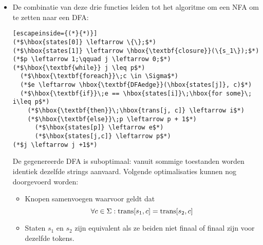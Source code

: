 \begin{itemize}
\begin{enumerate}
		Via deze functie, de startstaat $s_1$ en input string $c_1, ..., c_k$ kan de NFA simulatie als volgt geschreven worden:
			\begin{lstlisting}[escapeinside={(*}{*)}]
(*$d \leftarrow \hbox{\textbf{closure}}(\{s_1\})$*)
(*$\hbox{\textbf{for}} i \leftarrow 1\;\hbox{\textbf{to}}\;k$*)
  (*$d \leftarrow \hbox{\textbf{DFAedge}}(d, c_i)$*)
			\end{lstlisting}
	
		
	\end{enumerate}
	\item De combinatie van deze drie functies leiden tot het algoritme om een NFA om te zetten naar een DFA:
	\begin{lstlisting}[escapeinside={(*}{*)}]
(*$\hbox{states[0]} \leftarrow \{\};$*)
(*$\hbox{states[1]} \leftarrow \hbox{\textbf{closure}}(\{s_1\});$*)
(*$p \leftarrow 1;\qquad j \leftarrow 0;$*)
(*$\hbox{\textbf{while}} j \leq p$*)
  (*$\hbox{\textbf{foreach}}\;c \in \Sigma$*)
  (*$e \leftarrow \hbox{\textbf{DFAedge}}(\hbox{states[j]}, c)$*)
  (*$\hbox{\textbf{if}}\;e == \hbox{states[i]}\;\hbox{for some}\; i\leq p$*)
    (*$\hbox{\textbf{then}}\;\hbox{trans[j, c]} \leftarrow i$*)
    (*$\hbox{\textbf{else}}\;p \leftarrow p + 1$*)
      (*$\hbox{states[p]} \leftarrow e$*)
      (*$\hbox{states[j,c]} \leftarrow p$*)
(*$j \leftarrow j +1$*)
	\end{lstlisting}
	De gegenereerde DFA is suboptimaal: vanuit sommige toestanden worden identiek dezelfde strings aanvaard. Volgende optimalisaties kunnen nog doorgevoerd worden:
	\begin{itemize}
		\item Knopen samenvoegen waarvoor geldt dat 
		$$\forall c \in \Sigma: \hbox{trans}[s_1, c] = \hbox{trans}[s_2, c]$$
		\item Staten $s_1$ en $s_2$ zijn equivalent als ze beiden niet finaal of finaal zijn voor dezelfde tokens.
	\end{itemize}
\end{itemize}



